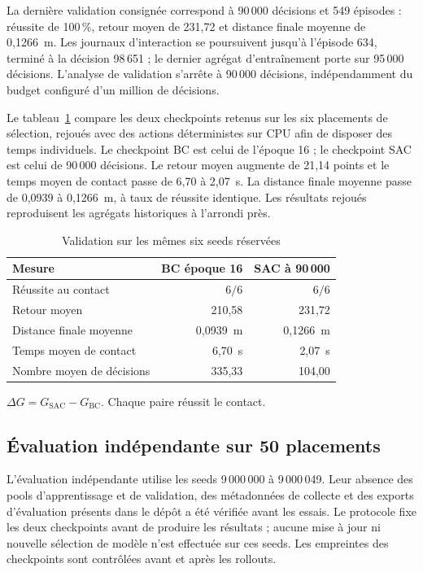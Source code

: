 \documentclass[conference,a4paper]{IEEEtran}
\begin{document}
La dernière validation consignée correspond à 90\,000 décisions et 549 épisodes : réussite de 100\,\%, retour moyen de 231,72 et distance finale moyenne de 0,1266~m. Les journaux d'interaction se poursuivent jusqu'à l'épisode 634, terminé à la décision 98\,651 ; le dernier agrégat d'entraînement porte sur 95\,000 décisions. L'analyse de validation s'arrête à 90\,000 décisions, indépendamment du budget configuré d'un million de décisions.

Le tableau~\ref{tab:results} compare les deux checkpoints retenus sur les six placements de sélection, rejoués avec des actions déterministes sur CPU afin de disposer des temps individuels. Le checkpoint BC est celui de l'époque 16 ; le checkpoint SAC est celui de 90\,000 décisions. Le retour moyen augmente de 21,14 points et le temps moyen de contact passe de 6,70 à 2,07~s. La distance finale moyenne passe de 0,0939 à 0,1266~m, à taux de réussite identique. Les résultats rejoués reproduisent les agrégats historiques à l'arrondi près.

\begin{table}[t]
\caption{Validation sur les mêmes six seeds réservées}
\label{tab:results}
\centering\small
\begin{tabular}{lrr}
\toprule
Mesure & BC époque 16 & SAC à 90\,000 \\
\midrule
Réussite au contact & $6/6$ & $6/6$ \\
Retour moyen & 210,58 & 231,72 \\
Distance finale moyenne & 0,0939~m & 0,1266~m \\
Temps moyen de contact & 6,70~s & 2,07~s \\
Nombre moyen de décisions & 335,33 & 104,00 \\
\bottomrule
\end{tabular}
\end{table}
\begin{table}[t]
\caption{Comparaison appariée sur les six seeds de sélection}
\label{tab:pairedvalidation}
\centering\small

\par\smallskip\footnotesize $\Delta G=G_{\mathrm{SAC}}-G_{\mathrm{BC}}$. Chaque paire réussit le contact.
\end{table}

\subsection{Évaluation indépendante sur 50 placements}
L'évaluation indépendante utilise les seeds 9\,000\,000 à 9\,000\,049. Leur absence des pools d'apprentissage et de validation, des métadonnées de collecte et des exports d'évaluation présents dans le dépôt a été vérifiée avant les essais. Le protocole fixe les deux checkpoints avant de produire les résultats ; aucune mise à jour ni nouvelle sélection de modèle n'est effectuée sur ces seeds. Les empreintes des checkpoints sont contrôlées avant et après les rollouts.
\end{document}
